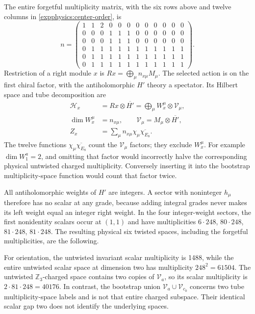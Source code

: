 The entire forgetful multiplicity matrix, with the six rows above
and twelve columns in \eqref{expphysics:center-order}, is
\begin{equation}
 n=\left(\begin{array}{rrrrrrrrrrrr}
 1&1&2&0&0&0&0&0&0&0&0&0\\
 0&0&0&1&1&1&0&0&0&0&0&0\\
 0&0&0&1&1&1&0&0&0&0&0&0\\
 0&1&1&1&1&1&1&1&1&1&1&1\\
 0&1&1&1&1&1&1&1&1&1&1&1\\
 0&1&1&1&1&1&1&1&1&1&1&1
 \end{array}\right).
 \label{expphysics:forgetful-matrix}
\end{equation}
Restriction of a right module $x$ is
$Rx=\bigoplus_\mu n_{x\mu}M_\mu$. The selected action is on
the first chiral factor, with the antiholomorphic $H'$ theory a
spectator. Its Hilbert space and tube decomposition are
\begin{align}
 \mathcal H_x&=Rx\otimes\overline{H'}
 =\bigoplus_\mu W_x^\mu\otimes\mathcal V_\mu,\\
 \dim W_x^\mu&=n_{x\mu},\qquad
 \mathcal V_\mu=M_\mu\otimes\overline{H'},\\
 Z_x&=\sum_\mu n_{x\mu}\chi_\mu\overline{\chi_{E_8}}.
 \label{expphysics:tube-conventions}
\end{align}
The twelve functions $\chi_\mu\overline{\chi_{E_8}}$ count the
$\mathcal V_\mu$ factors; they exclude $W_x^\mu$.
For example $\dim W_1^a=2$, and omitting that factor would
incorrectly halve the corresponding physical untwisted charged
multiplicity. Conversely inserting it into the bootstrap
multiplicity-space function would count that factor twice.



All antiholomorphic weights of $H'$ are integers. A sector with
noninteger $h_\mu$ therefore has no scalar at any grade, because
adding integral grades never makes its left weight equal an integer
right weight. In the four integer-weight sectors, the first
nonidentity scalars occur at $(1,1)$ and have multiplicities
$6\cdot248$, $80\cdot248$, $81\cdot248$, $81\cdot248$.
The resulting physical six twisted spaces, including the
forgetful multiplicities, are the following.



For orientation, the untwisted invariant scalar multiplicity is
1488, while the entire untwisted scalar space at dimension two
has multiplicity $248^2=61504$. The untwisted $\mathbb Z_3$-charged
space contains two copies of $\mathcal V_a$, so its scalar
multiplicity is $2\cdot81\cdot248=40176$. In contrast, the
bootstrap union $\mathcal V_a\cup\mathcal V_{c_0}$ concerns
two tube multiplicity-space labels and is not that entire charged
subspace. Their identical scalar gap two does not identify the
underlying spaces.


